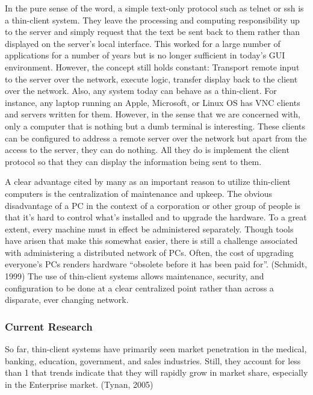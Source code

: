 \documentclass[12pt,oneside,letterpaper]{article}
\begin{document}
In the pure sense of the word, a simple text-only protocol such as telnet or ssh
is a thin-client system.  They leave the processing and computing responsibility
up to the server and simply request that the text be sent back to them rather
than displayed on the server's local interface.  This worked for a large number
of applications for a number of years but is no longer sufficient in today's GUI
environment.  However, the concept still holds constant: Transport remote input
to the server over the network, execute logic, transfer display back to the
client over the network.  Also, any system today can behave as a thin-client.
For instance, any laptop running an Apple, Microsoft, or Linux OS has VNC
clients and servers written for them.  However, in the sense that we are
concerned with, only a computer that is nothing but a dumb terminal is
interesting.  These clients can be configured to address a remote server over
the network but apart from the access to the server, they can do nothing.  All
they do is implement the client protocol so that they can display the
information being sent to them.

A clear advantage cited by many as an important reason to utilize thin-client
computers is the centralization of maintenance and upkeep.  The obvious
disadvantage of a PC in the context of a corporation or other group of people is
that it's hard to control what's installed and to upgrade the hardware.  To a
great extent, every machine must in effect be administered separately.  Though
tools have arisen that make this somewhat easier, there is still a challenge
associated with administering a distributed network of PCs.  Often, the cost of
upgrading everyone's PCs renders hardware ``obsolete before it has been paid
for''. (Schmidt, 1999) The use of thin-client systems allows maintenance,
security, and configuration to be done at a clear centralized point rather than
across a disparate, ever changing network.

\subsubsection{Current Research}

So far, thin-client systems have primarily seen market penetration in the
medical, banking, education, government, and sales industries. Still, they
account for less than 1%
that trends indicate that they will rapidly grow in market share, especially in
the Enterprise market. (Tynan, 2005)
\end{document}

